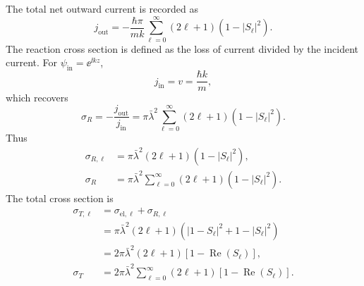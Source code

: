 The total net outward current is recorded as
\[
  j_{\mathrm{out}}
  =-\frac{\hbar\pi}{mk}
  \sum_{\ell=0}^{\infty}(2\ell+1)(1-|S_\ell|^2).
\]
The reaction cross section is defined as the loss of current divided by the incident current.  For $\psi_{\mathrm{in}}=\ee^{\ii kz}$,
\[
  j_{\mathrm{in}}=v=\frac{\hbar k}{m},
\]
which recovers
\[
  \sigma_R=-\frac{j_{\mathrm{out}}}{j_{\mathrm{in}}}
  =\pi\bar\lambda^2
  \sum_{\ell=0}^{\infty}(2\ell+1)(1-|S_\ell|^2).
\]
Thus
\begin{align}
  \sigma_{R,\ell}
  &=\pi\bar\lambda^2(2\ell+1)(1-|S_\ell|^2),\\
  \sigma_R
  &=\pi\bar\lambda^2\sum_{\ell=0}^{\infty}(2\ell+1)(1-|S_\ell|^2).
\end{align}
The total cross section is
\begin{align}
  \sigma_{T,\ell}
  &=\sigma_{\mathrm{el},\ell}+\sigma_{R,\ell}\\
  &=\pi\bar\lambda^2(2\ell+1)
  \left(|1-S_\ell|^2+1-|S_\ell|^2\right)\\
  &=2\pi\bar\lambda^2(2\ell+1)
  \left[1-\operatorname{Re}(S_\ell)\right],\\
  \sigma_T
  &=2\pi\bar\lambda^2\sum_{\ell=0}^{\infty}(2\ell+1)
  \left[1-\operatorname{Re}(S_\ell)\right].
\end{align}

